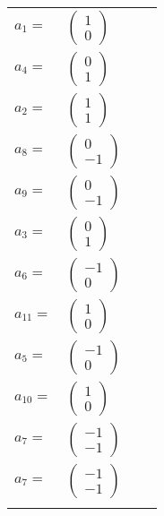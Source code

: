 \documentclass[1p]{elsarticle_modified}
\theoremstyle{definition}
\begin{document}
\begin{tabular}{m{7pt} m{180pt} m{7pt} m{180pt} }
\flushright $a_{1}=$&$\begin{pmatrix}1\\0\end{pmatrix}$ \\
\flushright $a_{4}=$&$\begin{pmatrix}0\\1\end{pmatrix}$ \\
\flushright $a_{2}=$&$\begin{pmatrix}1\\1\end{pmatrix}$ \\
\flushright $a_{8}=$&$\begin{pmatrix}0\\-1\end{pmatrix}$ \\
\flushright $a_{9}=$&$\begin{pmatrix}0\\-1\end{pmatrix}$ \\
\flushright $a_{3}=$&$\begin{pmatrix}0\\1\end{pmatrix}$ \\
\flushright $a_{6}=$&$\begin{pmatrix}-1\\0\end{pmatrix}$ \\
\flushright $a_{11}=$&$\begin{pmatrix}1\\0\end{pmatrix}$ \\
\flushright $a_{5}=$&$\begin{pmatrix}-1\\0\end{pmatrix}$ \\
\flushright $a_{10}=$&$\begin{pmatrix}1\\0\end{pmatrix}$ \\
\flushright $a_{7}=$&$\begin{pmatrix}-1\\-1\end{pmatrix}$\\ \flushright $a_{7}=$&$\begin{pmatrix}-1\\-1\end{pmatrix}$\\&\end{tabular}
\end{document}
